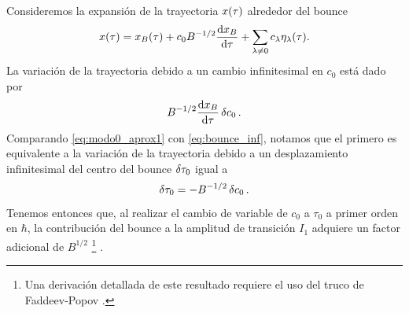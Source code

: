 Consideremos la expansión de la trayectoria $x\qty(\tau)$ alrededor del bounce
\begin{equation} \label{eq:trayec_bounce}
x\qty(\tau) 
= x_B \qty(\tau) + c_0 B^{-1/2} \dv{x_B}{\tau} + \sum_{\lambda \neq 0} c_\lambda\eta_\lambda\qty(\tau).
\end{equation}
La variación de la trayectoria debido a un cambio infinitesimal en $c_0$ está dado por
\begin{equation} \label{eq:modo0_aprox1}
	B^{-1/2} \dv{x_B}{\tau} \var{c_0}.
\end{equation}
Comparando \eqref{eq:modo0_aprox1} con \eqref{eq:bounce_inf}, notamos que el primero es equivalente a la variación de la trayectoria debido a un desplazamiento infinitesimal del centro del bounce $\var{\tau_0}$ igual a \begin{equation} \label{eq:var_tau}
	\var{\tau_0} = -B^{-1/2} \var{c_0}.
\end{equation} 
Tenemos entonces que, al realizar el cambio de variable de $c_0$ a $\tau_0$ a primer orden en $\hbar$, la contribución del bounce a la amplitud de transición $I_1$  adquiere un factor adicional de $ B^{1/2}$ \footnote{Una derivación detallada de este resultado requiere el uso del truco de Faddeev-Popov \cite{kleinert2009path, rubakov2009classical, andreassen2017precision}.} \cite{das2006field, kleinert2009path}.

